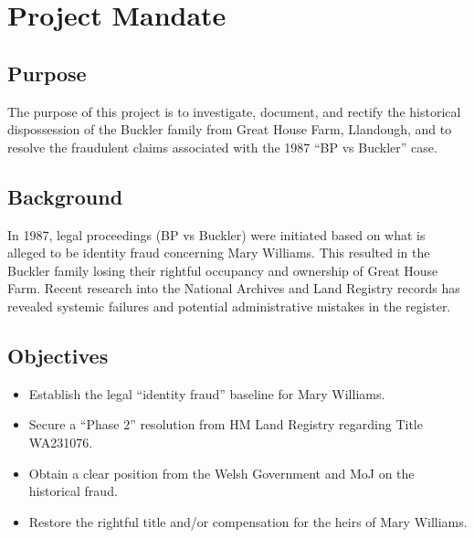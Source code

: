 \documentclass[letterpaper,10pt,openany,oneside,english]{sphinxmanual}
\begin{document}
\chapter{Project Mandate}
\label{\detokenize{mandate:project-mandate}}\label{\detokenize{mandate::doc}}

\section{Purpose}
\label{\detokenize{mandate:purpose}}
\sphinxAtStartPar
The purpose of this project is to investigate, document, and rectify the historical dispossession of the Buckler family from Great House Farm, Llandough, and to resolve the fraudulent claims associated with the 1987 “BP vs Buckler” case.


\section{Background}
\label{\detokenize{mandate:background}}
\sphinxAtStartPar
In 1987, legal proceedings (BP vs Buckler) were initiated based on what is alleged to be identity fraud concerning Mary Williams. This resulted in the Buckler family losing their rightful occupancy and ownership of Great House Farm. Recent research into the National Archives and Land Registry records has revealed systemic failures and potential administrative mistakes in the register.


\section{Objectives}
\label{\detokenize{mandate:objectives}}\begin{itemize}
\item {} 
\sphinxAtStartPar
Establish the legal “identity fraud” baseline for Mary Williams.

\item {} 
\sphinxAtStartPar
Secure a “Phase 2” resolution from HM Land Registry regarding Title WA231076.

\item {} 
\sphinxAtStartPar
Obtain a clear position from the Welsh Government and MoJ on the historical fraud.

\item {} 
\sphinxAtStartPar
Restore the rightful title and/or compensation for the heirs of Mary Williams.

\end{itemize}
\end{document}
